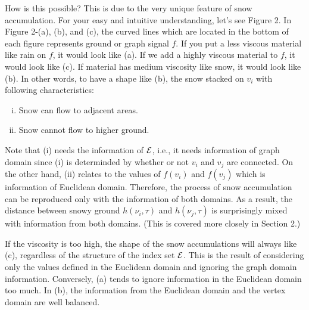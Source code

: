 \documentclass[preprint, review, 12pt]{article}
\theoremstyle{definition}
\theoremstyle{remark}
\begin{document}
How is this possible? This is due to the very unique feature of snow accumulation. For your easy and intuitive understanding, let's see Figure 2. In Figure 2-(a), (b), and (c), the curved lines which are located in the bottom of each figure represents ground or graph signal $f$. If you put a less viscous material like rain on $f$, it would look like (a). If we add a highly viscous material to $f$, it would look like (c). If material has medium viscosity like snow, it would look like (b). In other words, to have a shape like (b), the snow stacked on $v_i$ with following characteristics: 
\begin{enumerate}[(i)]
\item Snow can flow to adjacent areas.
\item Snow cannot flow to higher ground. 
\end{enumerate}
Note that (i) needs the information of ${\cal E}$, i.e., it needs information of graph domain since (i) is determinded by whether or not $v_i$ and $v_j$ are connected.  On the other hand, (ii) relates to the values of $f(v_i)$ and $f (v_j)$ which is information of Euclidean domain. Therefore, the process of snow accumulation can be reproduced only with the information of both domains. As a result, the distance between snowy ground $h(\nu_i,\tau)$ and $h(\nu_j,\tau)$ is surprisingly mixed with information from both domains. (This is covered more closely in Section 2.)

If the viscosity is too high, the shape of the snow accumulations will always like (c), regardless of the structure of the index set ${\cal E}$. This is the result of considering only the values defined in the Euclidean domain and ignoring the graph domain information. Conversely, (a) tends to ignore information in the Euclidean domain too much. In (b), the information from the Euclidean domain and the vertex domain are well balanced.
\end{document}
